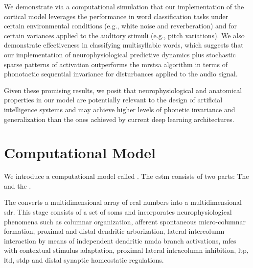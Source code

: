 \documentclass[10pt,letterpaper]{article}
\begin{document}
\pagebreak

We demonstrate via a computational simulation that our implementation of the cortical model leverages the performance in word classification tasks under certain environmental conditions (e.g., white noise and reverberation) and for certain variances applied to the auditory stimuli (e.g., pitch variations). We also demonstrate effectiveness in classifying multisyllabic words, which suggests that our implementation of neurophysiological predictive dynamics plus stochastic sparse patterns of activation outperforms the \gls{mrstsa} algorithm in terms of phonotactic sequential invariance for disturbances applied to the audio signal. 

Given these promising results, we posit that neurophysiological and anatomical properties in our model are potentially relevant to the design of artificial intelligence systems and may achieve higher levels of phonetic invariance and generalization than the ones achieved by current deep learning architectures.



























\section*{Computational Model}

We introduce a computational model called \textbf{}. The \gls{cstm} consists of two parts: The  and the . 

The  converts a multidimensional array of real numbers into a multidimensional \gls{sdr}.
This stage 
consists of
a set of \glspl{som} \cite{kohonen_2082, Kohonen:1989:SAM:69371}
and incorporates neurophysiological phenomena such as columnar organization, afferent spontaneous
micro-columnar formation, proximal and distal dendritic arborization, lateral intercolumn interaction by means of independent dendritic \gls{nmda} branch activations, \glspl{mfe} with contextual stimulus adaptation, proximal lateral intracolumn inhibition, \gls{ltp}, \gls{ltd}, \gls{stdp} and distal synaptic homeostatic regulations.
\end{document}
